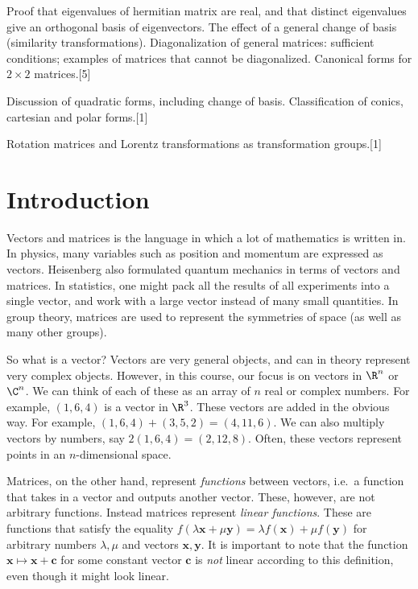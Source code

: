 \documentclass[a4paper]{article}
\begin{document}
{\vspace{5pt}
\noindent Proof that eigenvalues of hermitian matrix are real, and that distinct eigenvalues give an orthogonal basis of eigenvectors. The effect of a general change of basis (similarity transformations). Diagonalization of general matrices: sufficient conditions; examples of matrices that cannot be diagonalized. Canonical forms for $2 \times 2$ matrices.\hspace*{\fill}[5]

\vspace{5pt}
\noindent Discussion of quadratic forms, including change of basis. Classification of conics, cartesian and polar forms.\hspace*{\fill}[1]

\vspace{5pt}
\noindent Rotation matrices and Lorentz transformations as transformation groups.\hspace*{\fill}[1]}

\tableofcontents

\setcounter{section}{-1}
\section{Introduction}
Vectors and matrices is the language in which a lot of mathematics is written in. In physics, many variables such as position and momentum are expressed as vectors. Heisenberg also formulated quantum mechanics in terms of vectors and matrices. In statistics, one might pack all the results of all experiments into a single vector, and work with a large vector instead of many small quantities. In group theory, matrices are used to represent the symmetries of space (as well as many other groups).

So what is a vector? Vectors are very general objects, and can in theory represent very complex objects. However, in this course, our focus is on vectors in $\R^n$ or $\C^n$. We can think of each of these as an array of $n$ real or complex numbers. For example, $(1, 6, 4)$ is a vector in $\R^3$. These vectors are added in the obvious way. For example, $(1, 6, 4) + (3, 5, 2) = (4, 11, 6)$. We can also multiply vectors by numbers, say $2(1, 6, 4) = (2, 12, 8)$. Often, these vectors represent points in an $n$-dimensional space.

Matrices, on the other hand, represent \emph{functions} between vectors, i.e.\ a function that takes in a vector and outputs another vector. These, however, are not arbitrary functions. Instead matrices represent \emph{linear functions}. These are functions that satisfy the equality $f(\lambda \mathbf{x} + \mu \mathbf{y}) = \lambda f(\mathbf{x}) + \mu f(\mathbf{y})$ for arbitrary numbers $\lambda, \mu$ and vectors $\mathbf{x}, \mathbf{y}$. It is important to note that the function $\mathbf{x} \mapsto \mathbf{x} + \mathbf{c}$ for some constant vector $\mathbf{c}$ is \emph{not} linear according to this definition, even though it might look linear.
\end{document}
